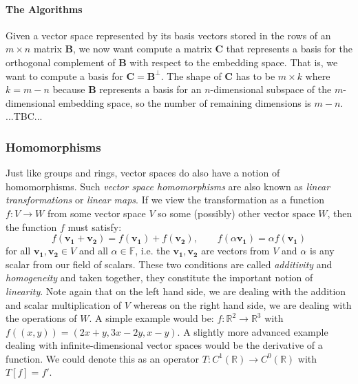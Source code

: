 \paragraph{The Algorithms}
Given a vector space represented by its basis vectors stored in the rows of an $m \times n$ matrix $\mathbf{B}$, we now want compute a matrix $\mathbf{C}$ that represents a basis for the orthogonal complement of $\mathbf{B}$ with respect to the embedding space. That is, we want to compute a basis for $\mathbf{C} = \mathbf{B}^\perp$. The shape of $\mathbf{C}$ has to be $m \times k$ where $k = m - n$ because $\mathbf{B}$ represents a basis for an $n$-dimensional subspace of the $m$-dimensional embedding space, so the number of remaining dimensions is $m-n$. ...TBC...


\subsubsection{Homomorphisms}
Just like groups and rings, vector spaces do also have a notion of homomorphisms. Such \emph{vector space homomorphisms} are also known as \emph{linear transformations} or \emph{linear maps}. If we view the transformation as a function $f: V \rightarrow W$ from some vector space $V$ so some (possibly) other vector space $W$, then the function $f$ must satisfy:
\begin{equation}
  f(\mathbf{v_1} + \mathbf{v_2}) = f(\mathbf{v_1}) + f(\mathbf{v_2}), \qquad
  f(\alpha \mathbf{v_1}) = \alpha f(\mathbf{v_1})
\end{equation}
for all $\mathbf{v_1, v_2} \in V$ and all $\alpha \in \mathbb{F}$, i.e. the $\mathbf{v_1, v_2}$ are vectors from $V$ and $\alpha$ is any scalar from our field of scalars. These two conditions are called \emph{additivity} and \emph{homogeneity} and taken together, they constitute the important notion of \emph{linearity}. Note again that on the left hand side, we are dealing with the addition and scalar multiplication of $V$ whereas on the right hand side, we are dealing with the operations of $W$. A simple example would be: $f: \mathbb{R}^2 \rightarrow \mathbb{R}^3$ with $f((x,y)) = (2 x + y, 3 x - 2 y, x - y)$. A slightly more advanced example dealing with infinite-dimensional vector spaces would be the derivative of a function. We could denote this as an operator $T: C^1(\mathbb{R}) \rightarrow C^0(\mathbb{R}) $ with $T[f] = f'$.

